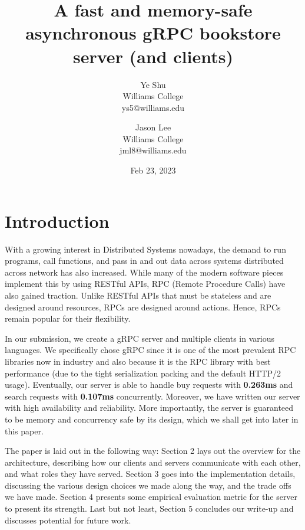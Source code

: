 \documentclass[letterpaper,11pt,twocolumn]{article}
\begin{document}
\title{A fast and memory-safe asynchronous gRPC bookstore server (and clients)}
\date{Feb 23, 2023}

\author{
  {\rm Ye Shu}\\
       Williams College\\
       ys5@williams.edu
\and
  {\rm Jason Lee}\\
       Williams College\\
       jml8@williams.edu
}

\maketitle

\thispagestyle{empty}


\section{Introduction}

With a growing interest in Distributed Systems nowadays, the demand to run programs, call functions, and pass in and out data across systems distributed across network has also increased.
While many of the modern software pieces implement this by using RESTful APIs, RPC (Remote Procedure Calls) have also gained traction. Unlike RESTful APIs that must be stateless and are designed around resources, RPCs are designed around actions. Hence, RPCs remain popular for their flexibility.

In our submission, we create a gRPC server and multiple clients in various languages. 
We specifically chose gRPC since it is one of the most prevalent RPC libraries now in industry and also because it is the RPC library with best performance (due to the tight serialization packing and the default HTTP/2 usage).
Eventually, our server is able to handle buy requests with \textbf{0.263ms} and search requests with \textbf{0.107ms} concurrently.
Moreover, we have written our server with high availability and reliability. More importantly, the server is guaranteed to be memory and concurrency safe by its design, which we shall get into later in this paper.

The paper is laid out in the following way: Section 2 lays out the overview for the architecture, describing how our clients and servers communicate with each other, and what roles they have served. Section 3 goes into the implementation details, discussing the various design choices we made along the way, and the trade offs we have made. Section 4 presents some empirical evaluation metric for the server to present its strength. Last but not least, Section 5 concludes our write-up and discusses potential for future work.
\end{document}
